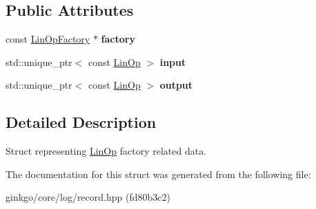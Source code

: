 \subsection*{Public Attributes}
\begin{DoxyCompactItemize}
\item 
\mbox{\label{structgko_1_1log_1_1linop__factory__data_abd892acbefd3c147e384a3dcc897f6ac}} 
const \hyperlink{classgko_1_1LinOpFactory}{Lin\+Op\+Factory} $\ast$ {\bfseries factory}
\item 
\mbox{\label{structgko_1_1log_1_1linop__factory__data_a6ea6595461c7157fa729c91239147f14}} 
std\+::unique\+\_\+ptr$<$ const \hyperlink{classgko_1_1LinOp}{Lin\+Op} $>$ {\bfseries input}
\item 
\mbox{\label{structgko_1_1log_1_1linop__factory__data_a5056dcdd50e3f842c2069959ca85b1c3}} 
std\+::unique\+\_\+ptr$<$ const \hyperlink{classgko_1_1LinOp}{Lin\+Op} $>$ {\bfseries output}
\end{DoxyCompactItemize}


\subsection{Detailed Description}
Struct representing \hyperlink{classgko_1_1LinOp}{Lin\+Op} factory related data. 



The documentation for this struct was generated from the following file\+:\begin{DoxyCompactItemize}
\item 
ginkgo/core/log/record.\+hpp (fd80b3c2)\end{DoxyCompactItemize}
